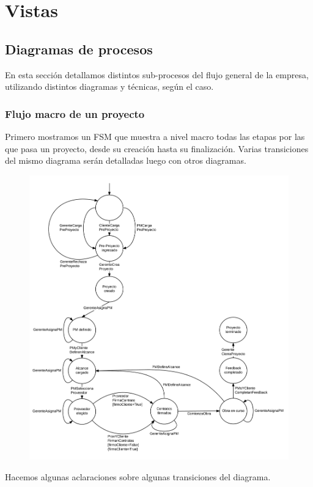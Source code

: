 \section{Vistas}




	\subsection{Diagramas de procesos}

En esta sección detallamos distintos sub-procesos del flujo general de la empresa, 
utilizando distintos diagramas y técnicas, según el caso. 

	\subsubsection{Flujo macro de un proyecto}
Primero mostramos un FSM que muestra a nivel macro todas las etapas por las 
que pasa un proyecto, desde su creación hasta su finalización. Varias transiciones 
del mismo diagrama serán detalladas luego con otros diagramas. 

\begin{figure}[H]
\centering
\includegraphics[width=0.8\linewidth]{diag/nuevos/fsm-proj.png}
\label{fsm-proj}
\end{figure}

Hacemos algunas aclaraciones sobre algunas transiciones del diagrama.\\

